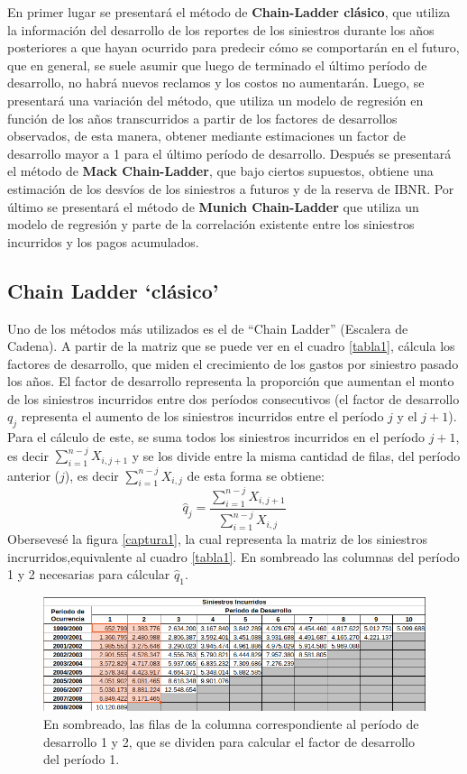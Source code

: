 \documentclass[
  12pt,
]{article}
\begin{document}
En primer lugar se presentará el método de \textbf{Chain-Ladder
clásico}, que utiliza la información del desarrollo de los reportes de
los siniestros durante los años posteriores a que hayan ocurrido para
predecir cómo se comportarán en el futuro, que en general, se suele
asumir que luego de terminado el último período de desarrollo, no habrá
nuevos reclamos y los costos no aumentarán. Luego, se presentará una
variación del método, que utiliza un modelo de regresión en función de
los años transcurridos a partir de los factores de desarrollos
observados, de esta manera, obtener mediante estimaciones un factor de
desarrollo mayor a 1 para el último período de desarrollo. Después se
presentará el método de \textbf{Mack Chain-Ladder}, que bajo ciertos
supuestos, obtiene una estimación de los desvíos de los siniestros a
futuros y de la reserva de IBNR. Por último se presentará el método de
\textbf{Munich Chain-Ladder} que utiliza un modelo de regresión y parte
de la correlación existente entre los siniestros incurridos y los pagos
acumulados.

\subsection{Chain Ladder `clásico'}\label{chain-ladder-cluxe1sico}

Uno de los métodos más utilizados es el de ``Chain Ladder'' (Escalera de
Cadena). A partir de la matriz que se puede ver en el cuadro
\ref{tabla1}, cálcula los factores de desarrollo, que miden el
crecimiento de los gastos por siniestro pasado los años. El factor de
desarrollo representa la proporción que aumentan el monto de los
siniestros incurridos entre dos períodos consecutivos (el factor de
desarrollo \(q_j\) representa el aumento de los siniestros incurridos
entre el período \(j\) y el \(j+1\)). Para el cálculo de este, se suma
todos los siniestros incurridos en el período \(j+1\), es decir
\(\sum_{i=1}^{n-j} X_{i,j+1}\) y se los divide entre la misma cantidad
de filas, del período anterior (\(j\)), es decir
\(\sum_{i=1}^{n-j} X_{i,j}\) de esta forma se obtiene: \[
\hat{q}_{j} = \frac{\sum_{i=1}^{n-j} X_{i,j+1}}{\sum_{i=1}^{n-j} X_{i,j}}
\] Obersevesé la figura \ref{captura1}, la cual representa la matriz de
los siniestros incrurridos,equivalente al cuadro \ref{tabla1}. En
sombreado las columnas del período 1 y 2 necesarias para cálcular
\(\hat{q}_{1}\).

\begin{figure}[ht]
\includegraphics[width=1\linewidth]{imagenes/captura1} \caption{\label{captura1} En sombreado, las filas de la columna correspondiente al período de desarrollo 1 y 2, que se dividen para calcular el factor de desarrollo del período 1.}\label{fig:unnamed-chunk-5}
\end{figure}
\end{document}
